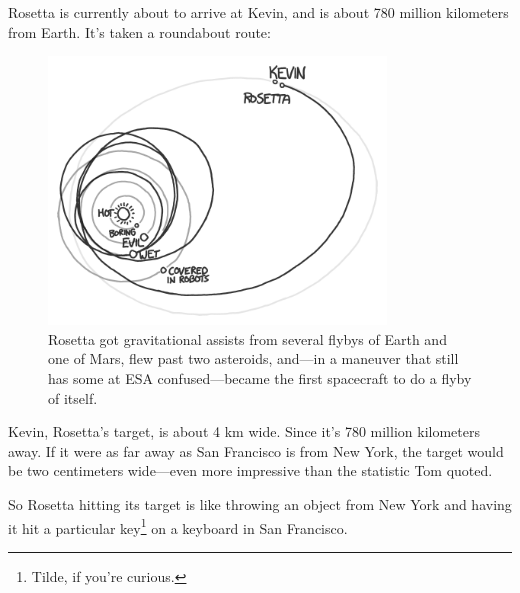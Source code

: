 {{Rosetta is currently about to arrive at Kevin, and is about 780 million kilometers from Earth. It's taken a roundabout route:}

\begin{figure}[!htbp]
\centering
\includegraphics[scale=0.5, max width=0.8\textwidth]{imgs/a/82/rosetta_route.png}
\caption{Rosetta got gravitational assists from several flybys of Earth and one of Mars, flew past two asteroids, and—in a maneuver that still has some at ESA confused—became the first spacecraft to do a flyby of itself.}
\end{figure}

{Kevin, Rosetta's target, is about 4 km wide. Since it's 780 million kilometers away. If it were as far away as San Francisco is from New York, the target would be two centimeters wide—even more impressive than the statistic Tom quoted.}

{So Rosetta hitting its target is like throwing an object from New York and having it hit a particular key{\footnote{Tilde, if you're curious.} } on a keyboard in San Francisco.}

}
